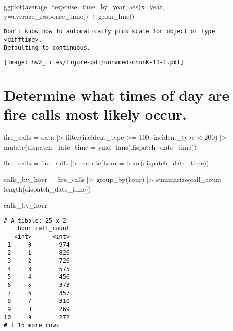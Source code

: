 \documentclass[
  letterpaper,
  DIV=11,
  numbers=noendperiod]{scrartcl}
\newenvironment{Shaded}{\begin{snugshade}}{\end{snugshade}}
\newcommand{\AttributeTok}[1]{\textcolor[rgb]{0.40,0.45,0.13}{#1}}
\newcommand{\DecValTok}[1]{\textcolor[rgb]{0.68,0.00,0.00}{#1}}
\newcommand{\FunctionTok}[1]{\textcolor[rgb]{0.28,0.35,0.67}{#1}}
\newcommand{\NormalTok}[1]{\textcolor[rgb]{0.00,0.23,0.31}{#1}}
\newcommand{\OtherTok}[1]{\textcolor[rgb]{0.00,0.23,0.31}{#1}}
\newcommand{\SpecialCharTok}[1]{\textcolor[rgb]{0.37,0.37,0.37}{#1}}
\begin{document}
\begin{Shaded}
\begin{Highlighting}[]
\FunctionTok{ggplot}\NormalTok{(average\_response\_time\_by\_year, }\FunctionTok{aes}\NormalTok{(}\AttributeTok{x=}\NormalTok{year, }\AttributeTok{y=}\NormalTok{average\_response\_time)) }\SpecialCharTok{+}
  \FunctionTok{geom\_line}\NormalTok{() }
\end{Highlighting}
\end{Shaded}

\begin{verbatim}
Don't know how to automatically pick scale for object of type <difftime>.
Defaulting to continuous.
\end{verbatim}

\texttt{[image: hw2\_files/figure-pdf/unnamed-chunk-11-1.pdf]}

\section{Determine what times of day are fire calls most likely
occur.}\label{determine-what-times-of-day-are-fire-calls-most-likely-occur.}

\begin{Shaded}
\begin{Highlighting}[]
\NormalTok{fire\_calls }\OtherTok{=}\NormalTok{ data }\SpecialCharTok{|\textgreater{}}
  \FunctionTok{filter}\NormalTok{(incident\_type }\SpecialCharTok{\textgreater{}=} \DecValTok{100}\NormalTok{, incident\_type }\SpecialCharTok{\textless{}} \DecValTok{200}\NormalTok{) }\SpecialCharTok{|\textgreater{}}
  \FunctionTok{mutate}\NormalTok{(}\AttributeTok{dispatch\_date\_time =} \FunctionTok{ymd\_hms}\NormalTok{(dispatch\_date\_time))}

\NormalTok{fire\_calls }\OtherTok{=}\NormalTok{ fire\_calls }\SpecialCharTok{|\textgreater{}}
  \FunctionTok{mutate}\NormalTok{(}\AttributeTok{hour =} \FunctionTok{hour}\NormalTok{(dispatch\_date\_time))}

\NormalTok{calls\_by\_hour }\OtherTok{=}\NormalTok{ fire\_calls }\SpecialCharTok{|\textgreater{}}
  \FunctionTok{group\_by}\NormalTok{(hour) }\SpecialCharTok{|\textgreater{}}
  \FunctionTok{summarize}\NormalTok{(}\AttributeTok{call\_count =} \FunctionTok{length}\NormalTok{(dispatch\_date\_time))}

\NormalTok{calls\_by\_hour}
\end{Highlighting}
\end{Shaded}

\begin{verbatim}
# A tibble: 25 x 2
    hour call_count
   <int>      <int>
 1     0        974
 2     1        826
 3     2        726
 4     3        575
 5     4        456
 6     5        373
 7     6        357
 8     7        310
 9     8        269
10     9        272
# i 15 more rows
\end{verbatim}
\end{document}
